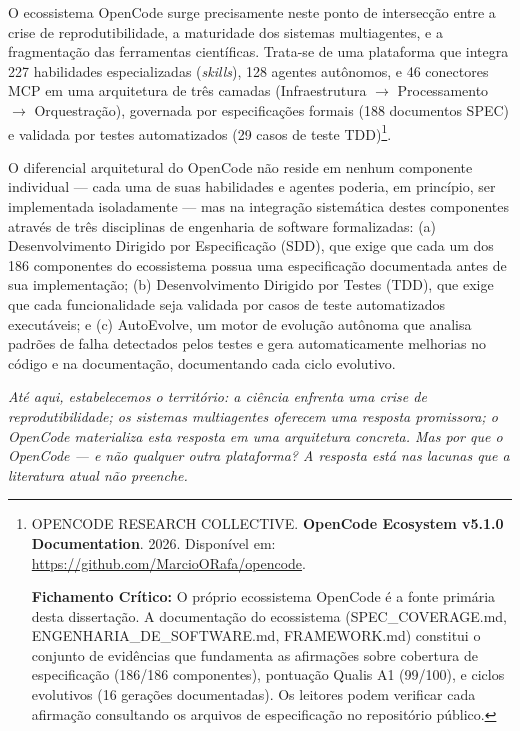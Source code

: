 O ecossistema OpenCode surge precisamente neste ponto de intersecção entre a crise de reprodutibilidade, a maturidade dos sistemas multiagentes, e a fragmentação das ferramentas científicas. Trata-se de uma plataforma que integra 227 habilidades especializadas (\textit{skills}), 128 agentes autônomos, e 46 conectores MCP em uma arquitetura de três camadas (Infraestrutura $\rightarrow$ Processamento $\rightarrow$ Orquestração), governada por especificações formais (188 documentos SPEC) e validada por testes automatizados (29 casos de teste TDD)\footnote{
  OPENCODE RESEARCH COLLECTIVE. \textbf{OpenCode Ecosystem v5.1.0 Documentation}. 2026. Disponível em: \url{https://github.com/MarcioORafa/opencode}.

  \textbf{Fichamento Crítico:} O próprio ecossistema OpenCode é a fonte primária desta dissertação. A documentação do ecossistema (SPEC\_COVERAGE.md, ENGENHARIA\_DE\_SOFTWARE.md, FRAMEWORK.md) constitui o conjunto de evidências que fundamenta as afirmações sobre cobertura de especificação (186/186 componentes), pontuação Qualis A1 (99/100), e ciclos evolutivos (16 gerações documentadas). Os leitores podem verificar cada afirmação consultando os arquivos de especificação no repositório público.
}.

O diferencial arquitetural do OpenCode não reside em nenhum componente individual --- cada uma de suas habilidades e agentes poderia, em princípio, ser implementada isoladamente --- mas na integração sistemática destes componentes através de três disciplinas de engenharia de software formalizadas: (a) Desenvolvimento Dirigido por Especificação (SDD), que exige que cada um dos 186 componentes do ecossistema possua uma especificação documentada antes de sua implementação; (b) Desenvolvimento Dirigido por Testes (TDD), que exige que cada funcionalidade seja validada por casos de teste automatizados executáveis; e (c) AutoEvolve, um motor de evolução autônoma que analisa padrões de falha detectados pelos testes e gera automaticamente melhorias no código e na documentação, documentando cada ciclo evolutivo.

\vspace{0.3cm}
{\small\itshape Até aqui, estabelecemos o território: a ciência enfrenta uma crise de reprodutibilidade; os sistemas multiagentes oferecem uma resposta promissora; o OpenCode materializa esta resposta em uma arquitetura concreta. Mas por que o OpenCode --- e não qualquer outra plataforma? A resposta está nas lacunas que a literatura atual não preenche.}

